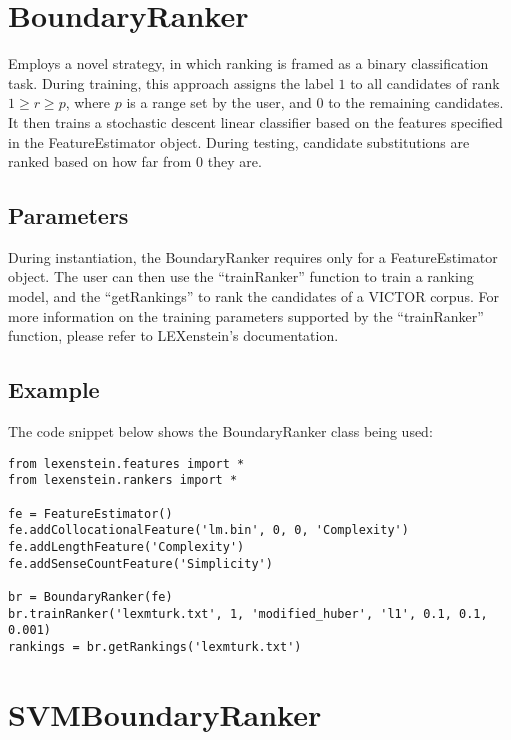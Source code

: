 \section{BoundaryRanker}

Employs a novel strategy, in which ranking is framed as a binary classification task. During training, this approach assigns the label $1$ to all candidates of rank $1\geq r \geq p$, where $p$ is a range set by the user, and $0$ to the remaining candidates. It then trains a stochastic descent linear classifier based on the features specified in the FeatureEstimator object. During testing, candidate substitutions are ranked based on how far from $0$ they are.

\subsection{Parameters}

During instantiation, the BoundaryRanker requires only for a FeatureEstimator object. The user can then use the ``trainRanker'' function to train a ranking model, and the ``getRankings'' to rank the candidates of a VICTOR corpus. For more information on the training parameters supported by the ``trainRanker'' function, please refer to LEXenstein's documentation.

\subsection{Example}

The code snippet below shows the BoundaryRanker class being used:

\begin{lstlisting}
from lexenstein.features import *
from lexenstein.rankers import *

fe = FeatureEstimator()
fe.addCollocationalFeature('lm.bin', 0, 0, 'Complexity')
fe.addLengthFeature('Complexity')
fe.addSenseCountFeature('Simplicity')

br = BoundaryRanker(fe)
br.trainRanker('lexmturk.txt', 1, 'modified_huber', 'l1', 0.1, 0.1, 0.001)
rankings = br.getRankings('lexmturk.txt')
\end{lstlisting}















\section{SVMBoundaryRanker}

